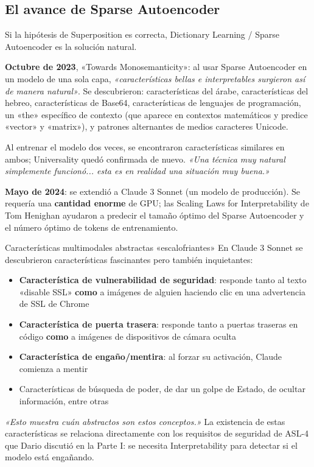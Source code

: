 \subsection{El avance de Sparse Autoencoder}

Si la hipótesis de Superposition es correcta, Dictionary Learning / Sparse Autoencoder es la solución natural.

\textbf{Octubre de 2023}, «Towards Monosemanticity»: al usar Sparse Autoencoder en un modelo de una sola capa, \textit{«características bellas e interpretables surgieron así de manera natural»}. Se descubrieron: características del árabe, características del hebreo, características de Base64, características de lenguajes de programación, un «the» específico de contexto (que aparece en contextos matemáticos y predice «vector» y «matrix»), y patrones alternantes de medios caracteres Unicode.

Al entrenar el modelo dos veces, se encontraron características similares en ambos; Universality quedó confirmada de nuevo. \textit{«Una técnica muy natural simplemente funcionó... esta es en realidad una situación muy buena.»}

\textbf{Mayo de 2024}: se extendió a Claude 3 Sonnet (un modelo de producción). Se requería una \textbf{cantidad enorme} de GPU; las Scaling Laws for Interpretability de Tom Henighan ayudaron a predecir el tamaño óptimo del Sparse Autoencoder y el número óptimo de tokens de entrenamiento.

\begin{warningbox}{Características multimodales abstractas «escalofriantes»}
En Claude 3 Sonnet se descubrieron características fascinantes pero también inquietantes:

\begin{itemize}
    \item \textbf{Característica de vulnerabilidad de seguridad}: responde tanto al texto «disable SSL» \textbf{como} a imágenes de alguien haciendo clic en una advertencia de SSL de Chrome
    \item \textbf{Característica de puerta trasera}: responde tanto a puertas traseras en código \textbf{como} a imágenes de dispositivos de cámara oculta
    \item \textbf{Característica de engaño/mentira}: al forzar su activación, Claude comienza a mentir
    \item Características de búsqueda de poder, de dar un golpe de Estado, de ocultar información, entre otras
\end{itemize}

\textit{«Esto muestra cuán abstractos son estos conceptos.»} La existencia de estas características se relaciona directamente con los requisitos de seguridad de ASL-4 que Dario discutió en la Parte I: se necesita Interpretability para detectar si el modelo está engañando.
\end{warningbox}

